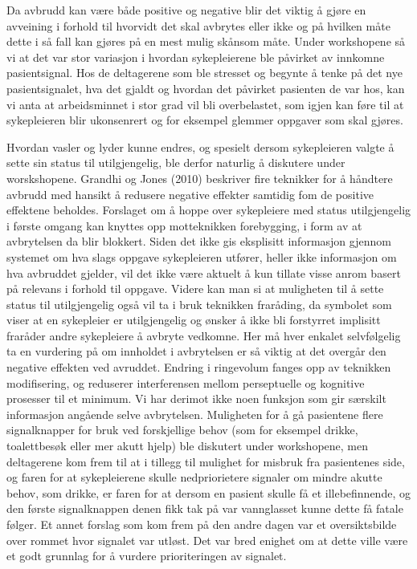 \noindent
Da avbrudd kan være både positive og negative blir det viktig å gjøre en avveining i forhold til hvorvidt det skal avbrytes eller ikke og på hvilken måte dette i så fall kan gjøres på en mest mulig skånsom måte. Under workshopene så vi at det var stor variasjon i hvordan sykepleierene ble påvirket av innkomne pasientsignal. Hos de deltagerene som ble stresset og begynte å tenke på det nye pasientsignalet, hva det gjaldt og hvordan det påvirket pasienten de var hos, kan vi anta at arbeidsminnet i stor grad vil bli overbelastet, som igjen kan føre til at sykepleieren blir ukonsenrert og for eksempel glemmer oppgaver som skal gjøres. 

\noindent
Hvordan vasler og lyder kunne endres, og spesielt dersom sykepleieren valgte å sette sin status til utilgjengelig, ble derfor naturlig å diskutere under worskshopene. Grandhi og Jones (2010) beskriver fire teknikker for å håndtere avbrudd med hansikt å redusere negative effekter samtidig fom de positive effektene beholdes. Forslaget om å hoppe over sykepleiere med status utilgjengelig i første omgang kan knyttes opp motteknikken forebygging, i form av at avbrytelsen da blir blokkert. Siden det ikke gis eksplisitt informasjon gjennom systemet om hva slags oppgave sykepleieren utfører, heller ikke informasjon om hva avbruddet gjelder, vil det ikke være aktuelt å kun tillate visse anrom basert på relevans i forhold til oppgave. Videre kan man si at muligheten til å sette status til utilgjengelig også vil ta i bruk teknikken fraråding, da symbolet som viser at en sykepleier er utilgjengelig og ønsker å ikke bli forstyrret implisitt fraråder andre sykepleiere å avbryte vedkomne. Her må hver enkalet selvfølgelig ta en vurdering på om innholdet i avbrytelsen er så viktig at det overgår den negative effekten ved avruddet. Endring i ringevolum fanges opp av teknikken modifisering, og reduserer interferensen mellom perseptuelle og kognitive prosesser til et minimum.
Vi har derimot ikke noen funksjon som gir særskilt informasjon angående selve avbrytelsen. Muligheten for å gå pasientene flere signalknapper for bruk ved forskjellige behov (som for eksempel drikke, toalettbesøk eller mer akutt hjelp) ble diskutert under workshopene, men deltagerene kom frem til at i tillegg til mulighet for misbruk fra pasientenes side, og faren for at sykepleierene skulle nedpriorietere signaler om mindre akutte behov, som drikke, er faren for at dersom en pasient skulle få et illebefinnende, og den første signalknappen denen fikk tak på var vannglasset kunne dette få fatale følger. Et annet forslag som kom frem på den andre dagen var et oversiktsbilde over rommet hvor signalet var utløst. Det var bred enighet om at dette ville være et godt grunnlag for å vurdere prioriteringen av signalet.   

